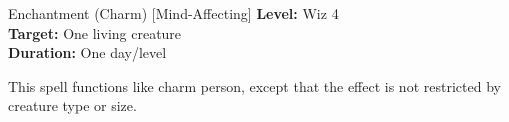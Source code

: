 {Enchantment (Charm) [Mind-Affecting]}
{
	\textbf{Level:}
	Wiz 4\\
	\textbf{Target:}
	One living creature\\
	\textbf{Duration:}
	One day/level\\
}
{
	This spell functions like charm person, except that the effect is not restricted by creature type or size.

}

